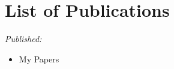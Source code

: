 



\chapter*{\rm\bfseries List of Publications}










\vspace{0.0cm}
\noindent
\textit{Published:}




\begin{itemize}

\item My Papers



\end{itemize}
